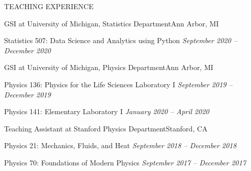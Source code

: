 \documentclass{resume} %
\begin{document}
\begin{rSection}{TEACHING EXPERIENCE} 

\begin{rSubsection}{GSI at University of Michigan, Statistics Department}{Ann Arbor, MI}{}{}
    \item Statistics 507: Data Science and Analytics using Python \hfill \textit{September 2020 -- December 2020}
\end{rSubsection} 
%
\begin{rSubsection}{GSI at University of Michigan, Physics Department}{Ann Arbor, MI}{}{}
    \item Physics 136: Physics for the Life Sciences Laboratory I \hfill \textit{September 2019 -- December 2019}
    \item Physics 141: Elementary Laboratory I \hfill \textit{January 2020 -- April 2020}
\end{rSubsection} 
%
\begin{rSubsection}{Teaching Assistant at Stanford Physics Department}{Stanford, CA}{}{}
    \item Physics 21: Mechanics, Fluids, and Heat \hfill \textit{September 2018 -- December 2018}
    \item Physics 70: Foundations of Modern Physics \hfill \textit{September 2017 -- December 2017}
\end{rSubsection} 
\end{rSection}
\end{document}
